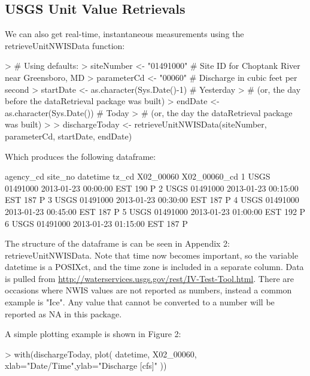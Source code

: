 \documentclass[a4paper,11pt]{article}
\begin{document}
\subsection{USGS Unit Value Retrievals}
We can also get real-time, instantaneous measurements using the retrieveUnitNWISData function:
\begin{Schunk}
\begin{Sinput}
> # Using defaults:
> siteNumber <- "01491000" # Site ID for Choptank River near Greensboro, MD
> parameterCd <- "00060"  # Discharge in cubic feet per second
> startDate <- as.character(Sys.Date()-1) # Yesterday 
>   # (or, the day before the dataRetrieval package was built)
> endDate <- as.character(Sys.Date()) # Today 
>   # (or, the day the dataRetrieval package was built)
> 
> dischargeToday <- retrieveUnitNWISData(siteNumber, parameterCd, startDate, endDate)
\end{Sinput}
\end{Schunk}
Which produces the following dataframe:
\begin{Schunk}
\begin{Soutput}
  agency_cd  site_no            datetime tz_cd X02_00060 X02_00060_cd
1      USGS 01491000 2013-01-23 00:00:00   EST       190            P
2      USGS 01491000 2013-01-23 00:15:00   EST       187            P
3      USGS 01491000 2013-01-23 00:30:00   EST       187            P
4      USGS 01491000 2013-01-23 00:45:00   EST       187            P
5      USGS 01491000 2013-01-23 01:00:00   EST       192            P
6      USGS 01491000 2013-01-23 01:15:00   EST       187            P
\end{Soutput}
\end{Schunk}
The structure of the dataframe is can be seen in Appendix 2: retrieveUnitNWISData. Note that time now becomes important, so the variable datetime is a POSIXct, and the time zone is included in a separate column. Data is pulled from \url{http://waterservices.usgs.gov/rest/IV-Test-Tool.html}. There are occasions where NWIS values are not reported as numbers, instead a common example is "Ice".  Any value that cannot be converted to a number will be reported as NA in this package.

A simple plotting example is shown in Figure 2:
\begin{Schunk}
\begin{Sinput}
> with(dischargeToday, plot(
   datetime, X02_00060,
   xlab="Date/Time",ylab="Discharge [cfs]"
   ))
\end{Sinput}
\end{Schunk}
\newpage
\end{document}
